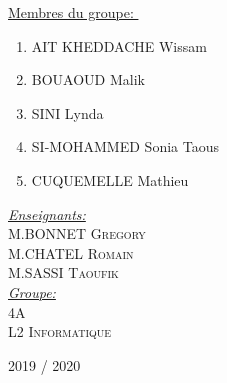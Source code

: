 \documentclass[12pt, a4paper, openany]{article}
\begin{document}
\begin{titlepage}
\begin{center}
    \begin{minipage}{0.4\textwidth}
      \begin{flushleft} \large
 { \color{RedViolet}\underline{Membres du groupe: }}\textsc{ } \
 \begin{enumerate}
 \item AIT KHEDDACHE Wissam
 \item BOUAOUD Malik
 \item SINI Lynda
 \item SI-MOHAMMED Sonia Taous
 \item CUQUEMELLE Mathieu
 \end{enumerate}
              \end{flushleft}
    \end{minipage}
    \begin{minipage}{0.4\textwidth}
      \begin{flushright} \large
\emph {\color{RedViolet}\underline{Enseignants: }} \\M.\textsc{BONNET Gregory}\\ M.\textsc{CHATEL Romain} \\ M.\textsc{SASSI Taoufik} 
     \\   \emph {\color{RedViolet}\underline{Groupe: }} \\  \textsc{4A \\ L2 Informatique}\\
      \end{flushright}
    \end{minipage}

    \vfill

    {\large 2019 / 2020 }

  \end{center}
  
 \end{titlepage}



\newpage

\tableofcontents
\setcounter{page}{0}

\newpage
\end{document}
